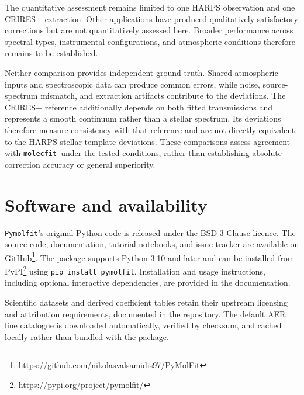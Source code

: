 \documentclass{aa}
\newcommand{\molecfit}{{\texttt{molecfit}}}
\newcommand{\Pymolfit}{\texttt{Pymolfit}}
\begin{document}
The quantitative assessment remains limited to one HARPS observation and one CRIRES+ extraction. Other applications have produced qualitatively satisfactory corrections but are not quantitatively assessed here. Broader performance across spectral types, instrumental configurations, and atmospheric conditions therefore remains to be established.

Neither comparison provides independent ground truth. Shared atmospheric inputs and spectroscopic data can produce common errors, while noise, source-spectrum mismatch, and extraction artifacts contribute to the deviations. The CRIRES+ reference additionally depends on both fitted transmissions and represents a smooth continuum rather than a stellar spectrum. Its deviations therefore measure consistency with that reference and are not directly equivalent to the HARPS stellar-template deviations. These comparisons assess agreement with \molecfit\ under the tested conditions, rather than establishing absolute correction accuracy or general superiority.


\section{Software and availability}

\Pymolfit's original Python code is released under the BSD 3-Clause licence. The source code, documentation, tutorial notebooks, and issue tracker are available on GitHub\footnote{\url{https://github.com/nikolasvalsamidis97/PyMolFit}}. The package supports Python 3.10 and later and can be installed from PyPI\footnote{\url{https://pypi.org/project/pymolfit/}} using \texttt{pip install pymolfit}. Installation and usage instructions, including optional interactive dependencies, are provided in the documentation.

Scientific datasets and derived coefficient tables retain their upstream licensing and attribution requirements, documented in the repository. The default AER line catalogue is downloaded automatically, verified by checksum, and cached locally rather than bundled with the package.

\end{document}
